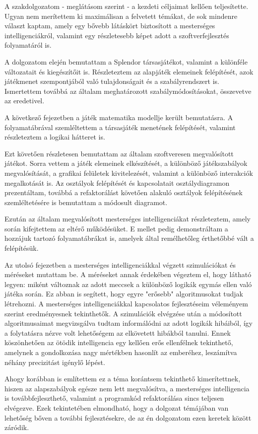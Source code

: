 
A szakdolgozatom - meglátásom szerint - a kezdeti céljaimat kellően teljesítette. Ugyan nem merítettem ki maximálisan a felvetett témákat, de sok mindenre választ kaptam, amely egy bővebb látáskört biztosított a mesterséges intelligenciákról, valamint egy részletesebb képet adott a szoftverfejlesztés folyamatáról is.

A dolgozatom elején bemutattam a Splendor társasjátékot, valamint a különféle változatait és kiegészítőit is. Részleteztem az alapjáték elemeinek felépítését, azok játékmenet szempontjából való tulajdonságait és a szabályrendszert is. Ismertettem továbbá az általam meghatározott szabálymódosításokat, összevetve az eredetivel.

A következő fejezetben a játék matematika modellje került bemutatásra. A folyamatábrával szemléltettem a társasjáték menetének felépítését, valamint részleteztem a logikai hátteret is.

Ezt követően részletesen bemutattam az általam szoftveresen megvalósított játékot. Sorra vettem a játék elemeinek elkészítését, a különböző játékszabályok megvalósítását, a grafikai felületek kivitelezését, valamint a különböző interakciók megalkotását is. Az osztályok felépítését és kapcsolatait osztálydiagramon prezentáltam, továbbá a refaktorálást követően alakuló osztályok felépítésének szemléltetésére is bemutattam a módosult diagramot.

Ezután az általam megvalósított mesterséges intelligenciákat részleteztem, amely során kifejtettem az eltérő működésüket. E mellet pedig demonstráltam a hozzájuk tartozó folyamatábrákat is, amelyek által remélhetőleg érthetőbbé vált a felépítésük.

Az utolsó fejezetben a mesterséges intelligenciákkal végzett szimulációkat és méréseket mutattam be. A méréseket annak érdekében végeztem el, hogy látható legyen: miként változnak az adott meccsek a különböző logikák egymás ellen való játéka során. Ez abban is segített, hogy egyre "erősebb" algoritmusokat tudjak létrehozni. A mesterséges intelligenciákkal kapcsolatos fejlesztéseim véleményem szerint eredményesnek tekinthetők. A szimulációk elvégzése után a módosított algoritmusaimat megvizsgálva tudtam informálódni az adott logikák hibáiból, így a folytatásra nézve volt lehetőségem az elkövetett hibákból tanulni. Ennek köszönhetően az ötödik intelligencia egy kellően erős ellenfélnek tekinthető, amelynek a gondolkozása nagy mértékben hasonlít az emberéhez, leszámítva néhány precizitást igénylő lépést.

Ahogy korábban is említettem ez a téma korántsem tekinthető kimerítettnek, hiszen az alapszabályok egésze nem lett megvalósítva, a mesterséges intelligencia is továbbfejleszthető, valamint a programkód refaktorálása sincs teljesen elvégezve. Ezek tekintetében elmondható, hogy a dolgozat témájában van lehetőség bőven a további fejlesztésekre, de az én dolgozatom ezen keretek között záródik.
